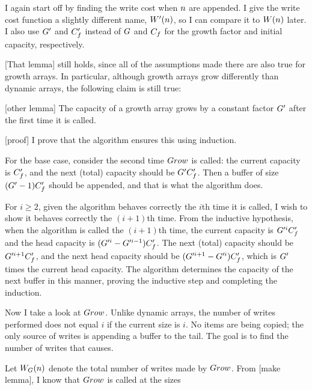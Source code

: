\groarrayimpl

\tcomplex

I again start off by finding the write cost when $n$ are appended. I give the write cost function a slightly different name, $W'(n)$, so I can compare it to $W(n)$ later. I also use $G'$ and $C_f'$ instead of $G$ and $C_f$ for the growth factor and initial capacity, respectively.

[That lemma] still holds, since all of the assumptions made there are also true for growth arrays. In particular, although growth arrays grow differently than dynamic arrays, the following claim is still true:

[other lemma]
The capacity of a growth array grows by a constant factor $G'$ after the first time it is called.

[proof]
I prove that the algorithm ensures this using induction.

For the base case, consider the second time $Grow$ is called: the current capacity is $C_f'$, and the next (total) capacity should be $G'C_f'$. Then a buffer of size $(G' - 1)C_f'$ should be appended, and that is what the algorithm does.

For $i \geq 2$, given the algorithm behaves correctly the $i$th time it is called, I wish to show it behaves correctly the $(i + 1)$th time. From the inductive hypothesis, when the algorithm is called the $(i + 1)$th time, the current capacity is $G'^iC_f'$ and the head capacity is $(G'^i - G'^{i - 1})C_f'$. The next (total) capacity should be $G'^{i + 1}C_f'$, and the next head capacity should be $(G'^{i + 1} - G'^i)C_f'$, which is $G'$ times the current head capacity. The algorithm determines the capacity of the next buffer in this manner, proving the inductive step and completing the induction.

Now I take a look at $Grow$. Unlike dynamic arrays, the number of writes performed does not equal $i$ if the current size is $i$. No items are being copied; the only source of writes is appending a buffer to the tail. The goal is to find the number of writes that causes.

Let $W_G(n)$ denote the total number of writes made by $Grow$. From [make lemma], I know that $Grow$ is called at the sizes

